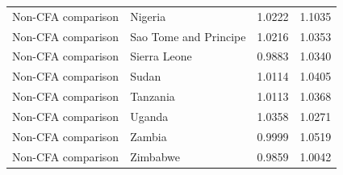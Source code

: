 \begin{table}
\begin{tabular}[t]{llrr}
Non-CFA comparison & Nigeria & 1.0222 & 1.1035\\
Non-CFA comparison & Sao Tome and Principe & 1.0216 & 1.0353\\
Non-CFA comparison & Sierra Leone & 0.9883 & 1.0340\\
\addlinespace
Non-CFA comparison & Sudan & 1.0114 & 1.0405\\
Non-CFA comparison & Tanzania & 1.0113 & 1.0368\\
Non-CFA comparison & Uganda & 1.0358 & 1.0271\\
Non-CFA comparison & Zambia & 0.9999 & 1.0519\\
Non-CFA comparison & Zimbabwe & 0.9859 & 1.0042\\
\bottomrule
\end{tabular}
\end{table}